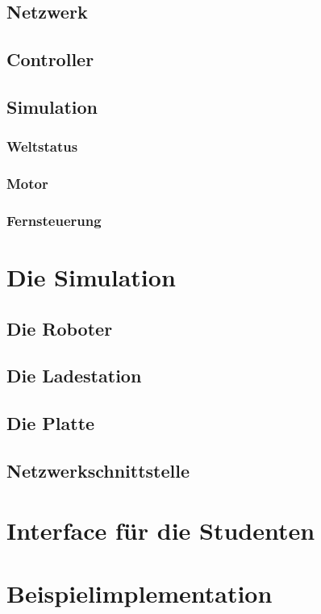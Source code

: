 \documentclass[ngerman]{scrartcl}
\begin{document}
\subsection{Netzwerk}
\subsection{Controller}
\subsection{Simulation}
\subsubsection{Weltstatus}
\subsubsection{Motor}
\subsubsection{Fernsteuerung}
\section{Die Simulation} %
\subsection{Die Roboter}\label{robot}
\subsection{Die Ladestation}\label{fuelstation}
\subsection{Die Platte}\label{plate}
\subsection{Netzwerkschnittstelle}
\section{Interface f{\"{u}}r die Studenten}\label{interface}%
\section{Beispielimplementation}
\end{document}
